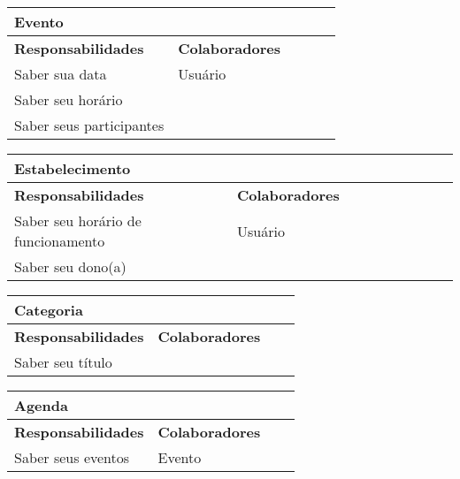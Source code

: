 \documentclass{article}
\begin{document}
\textcolor{red}{
    \begin{center}
   	 \begin{tabular}{|p{0.5\linewidth}|p{0.5\linewidth}|}
\hline
 	\multicolumn{2}{|p{\textwidth}|}{
{\large \textbf{Evento}}
}  \\
\hline
\textbf{Responsabilidades} & \textbf{Colaboradores} \\ 
\hline
  	Saber sua data & Usuário \\
  	\hline
  	Saber seu horário &  \\
  	\hline
  	Saber seus participantes & \\
  	\hline
   	\end{tabular} 
    \end{center}
}
\textcolor{red}{
    \begin{center}
   	 \begin{tabular}{|p{0.5\linewidth}|p{0.5\linewidth}|}
\hline
 	\multicolumn{2}{|p{\textwidth}|}{
{\large \textbf{Estabelecimento}}
}  \\
\hline
\textbf{Responsabilidades} & \textbf{Colaboradores} \\ 
\hline
  	Saber seu horário de funcionamento & Usuário \\
  	\hline
  	Saber seu dono(a) &  \\
  	\hline
   	\end{tabular} 
    \end{center}
}
\textcolor{red}{
    \begin{center}
   	 \begin{tabular}{|p{0.5\linewidth}|p{0.5\linewidth}|}
\hline
 	\multicolumn{2}{|p{\textwidth}|}{
{\large \textbf{Categoria}}
}  \\
\hline
\textbf{Responsabilidades} & \textbf{Colaboradores} \\ 
\hline
  	Saber seu título &  \\
  	\hline
   	\end{tabular} 
    \end{center}
}
\textcolor{red}{
    \begin{center}
   	 \begin{tabular}{|p{0.5\linewidth}|p{0.5\linewidth}|}
\hline
 	\multicolumn{2}{|p{\textwidth}|}{
{\large \textbf{Agenda}}
}  \\
\hline
\textbf{Responsabilidades} & \textbf{Colaboradores} \\ 
\hline
  	Saber seus eventos & Evento \\
  	\hline
   	\end{tabular} 
    \end{center}
}
\end{document}
